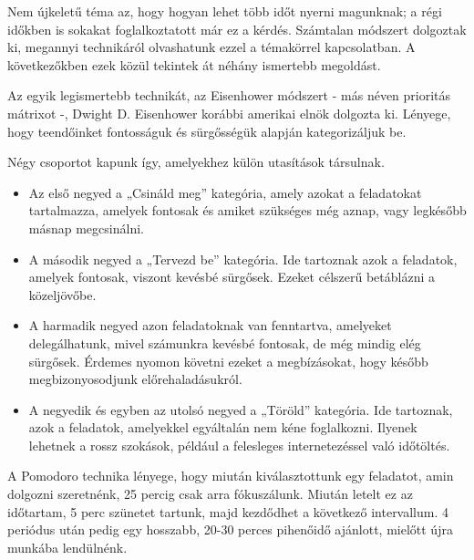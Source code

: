 

Nem újkeletű téma az, hogy hogyan lehet több időt nyerni magunknak; a régi időkben is sokakat foglalkoztatott már ez a kérdés. Számtalan módszert dolgoztak ki, megannyi technikáról olvashatunk ezzel a témakörrel kapcsolatban. A következőkben ezek közül tekintek át néhány ismertebb megoldást.


Az egyik legismertebb technikát, az Eisenhower módszert - más néven prioritás mátrixot -, Dwight D. Eisenhower korábbi amerikai elnök dolgozta ki. Lényege, hogy teendőinket fontosságuk és sürgősségük alapján kategorizáljuk be.


Négy csoportot kapunk így, amelyekhez külön utasítások társulnak.
\begin{itemize}
\item Az első negyed a „Csináld meg” kategória, amely azokat a feladatokat tartalmazza, amelyek fontosak és amiket szükséges még aznap, vagy legkésőbb másnap megcsinálni.
\item A második negyed a „Tervezd be” kategória. Ide tartoznak azok a feladatok, amelyek fontosak, viszont kevésbé sürgősek. Ezeket célszerű betáblázni a közeljövőbe.
\item A harmadik negyed azon feladatoknak van fenntartva, amelyeket delegálhatunk, mivel számunkra kevésbé fontosak, de még mindig elég sürgősek. Érdemes nyomon követni ezeket a megbízásokat, hogy később megbizonyosodjunk előrehaladásukról.
\item A negyedik és egyben az utolsó negyed a „Töröld” kategória. Ide tartoznak, azok a feladatok, amelyekkel egyáltalán nem kéne foglalkozni. Ilyenek lehetnek a rossz szokások, például a felesleges internetezéssel való időtöltés.
\end{itemize}
 

A Pomodoro technika lényege, hogy miután kiválasztottunk egy feladatot, amin dolgozni szeretnénk, 25 percig csak arra fókuszálunk. Miután letelt ez az időtartam, 5 perc szünetet tartunk, majd kezdődhet a következő intervallum. 4 periódus után pedig egy hosszabb, 20-30 perces pihenőidő ajánlott, mielőtt újra munkába lendülnénk.

